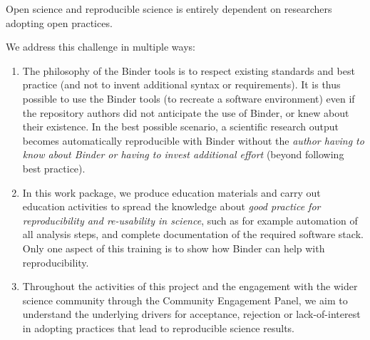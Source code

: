 \begin{workpackage}

\begin{wpdescription}

  Open science and reproducible science is entirely dependent on researchers
  adopting open practices. 

  We address this challenge in multiple ways:
  \begin{enumerate}
  \item The philosophy of the Binder tools is to respect existing standards and
    best practice (and not to invent additional syntax or requirements). It is
    thus possible to use the Binder tools (to recreate a software environment)
    even if the repository authors did not anticipate the use of Binder, or knew
    about their existence. In the best possible scenario, a scientific research
    output becomes automatically reproducible with Binder without the
    \emph{author having to know about Binder or having to invest additional
      effort} (beyond following best practice).

    \item In this work package, we produce education materials and carry out
      education activities to spread the knowledge about \emph{good practice for
        reproducibility and re-usability in science}, such as for example
      automation of all analysis steps, and complete documentation of the
      required software stack. Only one aspect of this training is to show how
      Binder can help with reproducibility.

    \item Throughout the activities of this project and the engagement with the
      wider science community through the Community Engagement Panel, we aim to understand 
      the underlying drivers for
      acceptance, rejection or lack-of-interest in adopting practices that lead
      to reproducible science results.
  \end{enumerate}



\end{wpdescription}
\end{workpackage}
